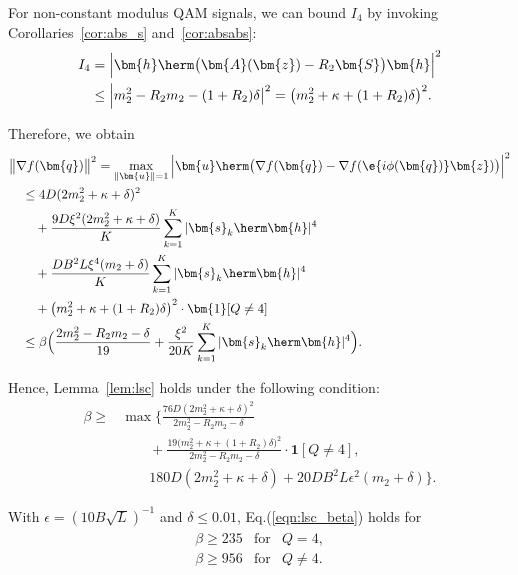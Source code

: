 For non-constant modulus QAM signals, we can bound $I_4$ by invoking Corollaries~\ref{cor:abs_s} and~\ref{cor:absabs}:
\begin{align}
	I_4&=\Big|\bm{h}\herm\big(\bm{A}(\bm{z})-R_2\bm{S}\big)\bm{h}\Big|^2\nonumber\\
	&\leq \Big|m_2^2-R_2m_2-(1+R_2)\delta\big|^2=\big(m_2^2+\kappa+(1+R_2)\delta\big)^2.\nonumber
\end{align}

Therefore, we obtain
\begin{align}
	&\big\|\nabla f(\bm{q})\big\|^2= \max_{\|\bm{u}\|=1}\Big|\bm{u}\herm\big(\nabla f(\bm{q})-\nabla f(\e{i\phi(\bm{q})}\bm{z})\big)\Big|^2\nonumber\\
	&\quad\leq 4D(2 m_2^2+\kappa+\delta)^2\nonumber\\
	&\qquad+\frac{9D\xi^2(2 m_2^2+\kappa+\delta)}{K}\sum_{k=1}^K|\bm{s}_k\herm\bm{h}|^4\nonumber\\
	&\qquad+\frac{DB^2L\xi^4(  m_2+\delta)}{K}\sum_{k=1}^K|\bm{s}_k\herm\bm{h}|^4\nonumber\\
	&\qquad+\big(m_2^2+\kappa+(1+R_2)\delta\big)^2\cdot\bm{1}[Q\neq 4]\nonumber\\
	&\quad\leq\beta\Big(\frac{2  m_2^2-R_2m_2-\delta}{19}+\frac{\xi^2}{20K}\sum_{k=1}^K|\bm{s}_k\herm\bm{h}|^4\Big).\nonumber
\end{align}

Hence, Lemma~\ref{lem:lsc} holds under the following condition:
\begin{align}
	\beta\geq&\max\Big\{\frac{76D(2m_2^2+\kappa+\delta)^2}{2m_2^2-R_2m_2-\delta}
	\nonumber\\&\qquad 
	+\frac{19(m_2^2+\kappa+(1+R_2)\delta\big)^2}{2m_2^2-R_2m_2-\delta}\cdot\bm{1}[Q\neq4], \nonumber\\
	&\qquad 180D(2m_2^2+\kappa+\delta)+20DB^2L\epsilon^2(m_2+\delta)\Big\}.\label{eqn:lsc_beta}
\end{align}

With $\epsilon=(10B\sqrt{L})^{-1}$ and $\delta\leq0.01$, Eq.(\ref{eqn:lsc_beta}) holds for 
\begin{align}
	\begin{array}{lcc}
		\beta\geq 235&\text{for}&Q=4,\\
		\beta\geq 956&\text{for}&Q\neq4.\\
	\end{array}	\nonumber
\end{align} 